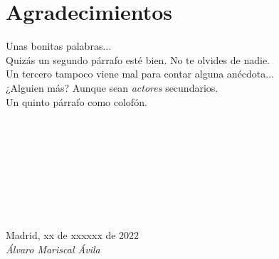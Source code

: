 \cleardoublepage

\chapter*{Agradecimientos}

Unas bonitas palabras...\\

Quizás un segundo párrafo esté bien. No te olvides de nadie.\\

Un tercero tampoco viene mal para contar alguna anécdota...\\

¿Alguien más? Aunque sean \textit{actores} secundarios.\\

Un quinto párrafo como colofón.\\
\ %

\

\

\

\

\begin{flushright}
		\vspace{4.0 cm}
		\vspace{1.0 cm}
		Madrid, xx de xxxxxx de 2022\\ %
		\emph{Álvaro Mariscal Ávila}
\end{flushright}

\thispagestyle{empty}

